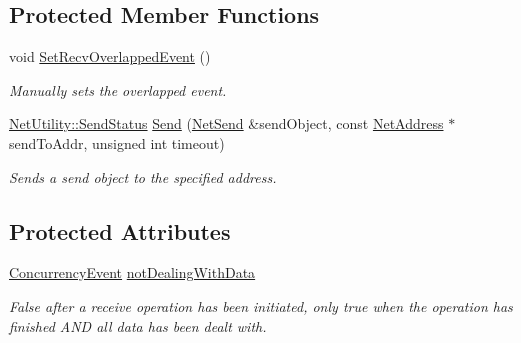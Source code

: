 \subsection*{Protected Member Functions}
\begin{DoxyCompactItemize}
\item 
void \hyperlink{class_net_socket_a41017899d90bb50e70345c5fcfbce577}{SetRecvOverlappedEvent} ()
\begin{DoxyCompactList}\small\item\em Manually sets the overlapped event. \item\end{DoxyCompactList}\item 
\hyperlink{class_net_utility_a8051eca61204ffd818281419bbf44736}{NetUtility::SendStatus} \hyperlink{class_net_socket_a35080a7efc36c4a4444dcf8a35213ccd}{Send} (\hyperlink{class_net_send}{NetSend} \&sendObject, const \hyperlink{class_net_address}{NetAddress} $\ast$sendToAddr, unsigned int timeout)
\begin{DoxyCompactList}\small\item\em Sends a send object to the specified address. \item\end{DoxyCompactList}\end{DoxyCompactItemize}
\subsection*{Protected Attributes}
\begin{DoxyCompactItemize}
\item 
\hyperlink{class_concurrency_event}{ConcurrencyEvent} \hyperlink{class_net_socket_a03f60f949b31ee3feae0d1d3daa3bf3c}{notDealingWithData}
\begin{DoxyCompactList}\small\item\em False after a receive operation has been initiated, only true when the operation has finished AND all data has been dealt with. \item\end{DoxyCompactList}\end{DoxyCompactItemize}
